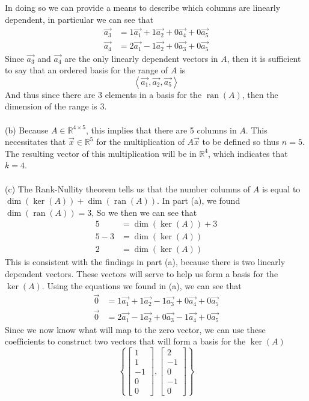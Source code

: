 \documentclass{report}
\begin{document}
In doing so we can provide a means to describe which columns are linearly dependent, in particular we can see that
$$
\begin{aligned}
\vec{a_3} & = 1\vec{a_1} + 1\vec{a_2} + 0\vec{a_4} + 0\vec{a_5} \\
\vec{a_4} & = 2\vec{a_1} - 1\vec{a_2} + 0\vec{a_3} + 0\vec{a_5}
\end{aligned}
$$
Since $\vec{a_3}$ and $\vec{a_4}$ are the only linearly dependent vectors in $A$, then it is sufficient to say that an ordered basis for the range of $A$ is
$$
\left\langle \vec{a_1}, \vec{a_2}, \vec{a_5} \right\rangle
$$
And thus since there are 3 elements in a basis for the $\operatorname{ran}(A)$, then the dimension of the range is 3. \\
\\
\noindent (b) Because $A\in\mathbb{R}^{4\times5}$, this implies that there are 5 columns in $A$. This necessitates that $\vec{x}\in\mathbb{R}^5$ for the multiplication of $A\vec{x}$ to be defined so thus $n = 5$. The resulting vector of this multiplication will be in $\mathbb{R}^4$, which indicates that $k=4$. \\
\\
\noindent (c) The Rank-Nullity theorem tells us that the number columns of $A$ is equal to $\operatorname{dim}(\operatorname{ker}(A))+\operatorname{dim}(\operatorname{ran}(A))$. In part (a), we found $\operatorname{dim}(\operatorname{ran}(A)) = 3$, So we then we can see that
$$
\begin{aligned}
5 & = \operatorname{dim}(\operatorname{ker}(A)) + 3 \\
5 - 3 & = \operatorname{dim}(\operatorname{ker}(A))\\
2 & = \operatorname{dim}(\operatorname{ker}(A))
\end{aligned}
$$
This is consistent with the findings in part (a), because there is two linearly dependent vectors. These vectors will serve to help us form a basis for the $\operatorname{ker}(A)$. Using the equations we found in (a), we can see that
$$
\begin{aligned}
\vec{0} & = 1\vec{a_1} + 1\vec{a_2} - 1\vec{a_3} + 0\vec{a_4} + 0\vec{a_5} \\
\vec{0} & = 2\vec{a_1} - 1\vec{a_2} + 0\vec{a_3} - 1\vec{a_4} + 0\vec{a_5}
\end{aligned}
$$
Since we now know what will map to the zero vector, we can use these coefficients to construct two vectors that will form a basis for the $\operatorname{ker}(A)$
$$
\left\{
\begin{bmatrix} 1 \\ 1 \\ -1 \\ 0 \\ 0 \end{bmatrix},
\begin{bmatrix} 2 \\ -1 \\ 0 \\ -1 \\ 0 \end{bmatrix}
\right\}
$$
\end{document}
